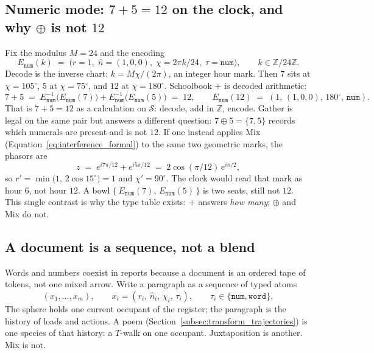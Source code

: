 \documentclass[12pt, a4paper]{article}
\begin{document}
\subsection{Numeric mode: $7+5=12$ on the clock, and why $\oplus$ is not $12$}
\label{subsec:clock_encoding}
Fix the modulus $M=24$ and the encoding
\begin{equation}
    E_{\mathtt{num}}(k)
    \;=\;
    \bigl(r=1,\;\hat n=(1,0,0),\;\chi=2\pi k/24,\;\tau=\mathtt{num}\bigr),
    \qquad
    k\in\mathbb{Z}/24\mathbb{Z}.
    \label{eq:clock_encoding}
\end{equation}
Decode is the inverse chart: $k = M\chi/(2\pi)$, an integer hour mark.
Then $7$ sits at $\chi=105^\circ$, $5$ at $\chi=75^\circ$, and $12$ at
$\chi=180^\circ$. Schoolbook $+$ is decoded arithmetic:
\begin{equation}
    7+5
    \;=\;
    E_{\mathtt{num}}^{-1}\bigl(E_{\mathtt{num}}(7)\bigr)
    +
    E_{\mathtt{num}}^{-1}\bigl(E_{\mathtt{num}}(5)\bigr)
    \;=\; 12,
    \qquad
    E_{\mathtt{num}}(12)
    \;=\;
    (1,\,(1,0,0),\,180^\circ,\,\mathtt{num}).
\end{equation}
That is $7+5=12$ as a calculation on $\mathcal{S}$: decode, add in
$\mathbb{Z}$, encode. Gather is legal on the same pair but answers a
different question: $7\oplus 5=\{7,5\}$ records which numerals are
present and is not $12$. If one instead applies Mix
(Equation~\eqref{eq:interference_formal}) to the same two geometric
marks, the phasors are
\begin{equation}
    z
    \;=\;
    e^{i 7\pi/12} + e^{i 5\pi/12}
    \;=\;
    2\cos(\pi/12)\,e^{i\pi/2},
\end{equation}
so $r'=\min\bigl(1,\,2\cos 15^\circ\bigr)=1$ and $\chi'=90^\circ$.
The clock would read that mark as hour $6$, not hour $12$.
A bowl $\{\,E_{\mathtt{num}}(7),\,E_{\mathtt{num}}(5)\,\}$ is two seats,
still not $12$. This single contrast is why the type table exists:
$+$ answers \emph{how many}; $\oplus$ and Mix do not.

\subsection{A document is a sequence, not a blend}
\label{subsec:document_sequence}
Words and numbers coexist in reports because a document is an ordered
tape of tokens, not one mixed arrow. Write a paragraph as a sequence
of typed atoms
\begin{equation}
    (x_1,\ldots,x_m),
    \qquad
    x_i=(r_i,\,\hat n_i,\,\chi_i,\,\tau_i),
    \qquad
    \tau_i\in\{\mathtt{num},\mathtt{word}\},
    \label{eq:mixed_document}
\end{equation}
The sphere holds one current occupant of the register; the paragraph is the history of
loads and actions. A poem
(Section~\ref{subsec:transform_trajectories}) is one species of that
history: a $T$-walk on one occupant. Juxtaposition is another. Mix is
not.
\end{document}
